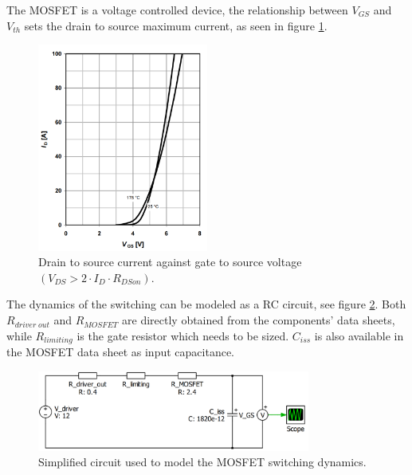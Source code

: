 The MOSFET is a voltage controlled device, the relationship between $V_{GS}$ and $V_{th}$ sets the drain to source maximum current, as seen in figure \ref{ids_vgs}\cite{mosfet_datasheet}.

\begin{figure}[H]
	\begin{center}
		\includegraphics[width=0.5\textwidth]{../Pictures/P1/Component_sizing/ids_against_vgs.png}
		\caption{Drain to source current against gate to source voltage $(V_{DS} > 2 \cdot I_{D}\cdot R_{DSon})$.}
		\label{ids_vgs}
	\end{center}
\end{figure}


The dynamics of the switching can be modeled as a RC circuit, see figure \ref{mosfet_rc_gate}. Both $R_{driver \; out}$ and $R_{MOSFET}$ are directly obtained from the components' data sheets, while $R_{limiting}$ is the gate resistor which needs to be sized. $C_{iss}$ is also available in the MOSFET data sheet as input capacitance.



\begin{figure}[H]
	\begin{center}
		\includegraphics[width=0.8\textwidth]{../Pictures/P1/Component_sizing/driver_resistor_sizing.png}
		\caption{Simplified circuit used to model the MOSFET switching dynamics.}
		\label{mosfet_rc_gate}
	\end{center}	
\end{figure}

